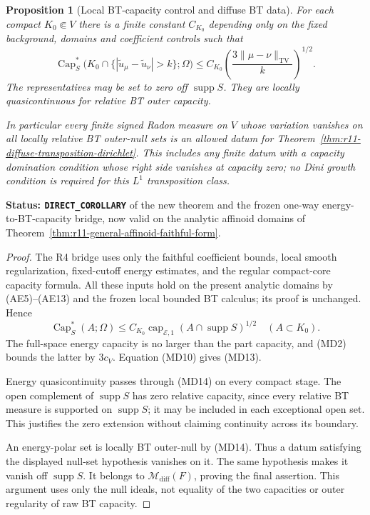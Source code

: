 \documentclass[11pt,a4paper]{article}
\numberwithin{equation}{section}
\newtheorem{proposition}[theorem]{Proposition}
\theoremstyle{definition}
\theoremstyle{remark}
\begin{document}
\begin{proposition}[Local BT-capacity control and diffuse BT data]
\label{prop:r11-bt-capacity-diffuse-dirichlet}
For each compact $K_0\Subset V$ there is a finite constant
$C_{K_0}$ depending only on the fixed background, domains and
coefficient controls such that
\[
 \operatorname{Cap}_S^*
   \bigl(K_0\cap\{|\widetilde u_\mu-\widetilde u_\nu|>k\};\Omega\bigr)
       \leq C_{K_0}
           \left(\frac{3\|\mu-\nu\|_{\mathrm{TV}}}{k}\right)^{1/2}.
 \tag{MD13}
\]
The representatives may be set to zero off $\operatorname{supp}S$.
They are locally quasicontinuous for relative BT outer capacity.

In particular every finite signed Radon measure on $V$ whose
variation vanishes on all locally relative BT outer-null sets
is an allowed datum for Theorem~\ref{thm:r11-diffuse-transposition-dirichlet}.
This includes any finite datum with a capacity domination
condition whose right side vanishes at capacity zero; no Dini
growth condition is required for this $L^1$ transposition class.
\end{proposition}

\noindent\textbf{Status: \texttt{DIRECT\_COROLLARY}} of the
new theorem and the frozen one-way energy-to-BT-capacity bridge,
now valid on the analytic affinoid domains of
Theorem~\ref{thm:r11-general-affinoid-faithful-form}.

\begin{proof}
The R4 bridge uses only the faithful coefficient bounds,
local smooth regularization, fixed-cutoff energy estimates,
and the regular compact-core capacity formula.  All these
inputs hold on the present analytic domains by (AE5)--(AE13)
and the frozen local bounded BT calculus; its proof is
unchanged.  Hence
\[
 \operatorname{Cap}_S^*(A;\Omega)
       \leq C_{K_0}\operatorname{cap}_{\mathcal E,1}
                  (A\cap\operatorname{supp}S)^{1/2}
                         \quad(A\subset K_0).
 \tag{MD14}
\]
The full-space energy capacity is no larger than the part
capacity, and (MD2) bounds the latter by $3c_V$.
Equation (MD10) gives (MD13).

Energy quasicontinuity passes through (MD14) on every compact
stage.  The open complement of $\operatorname{supp}S$ has
zero relative capacity, since every relative BT measure is
supported on $\operatorname{supp}S$; it may be included in
each exceptional open set.  This justifies the zero extension
without claiming continuity across its boundary.

An energy-polar set is locally BT outer-null by (MD14).
Thus a datum satisfying the displayed null-set hypothesis
vanishes on it.  The same hypothesis makes it vanish off
$\operatorname{supp}S$.  It belongs to
$\mathcal M_{\mathrm{diff}}(F)$, proving the final assertion.
This argument uses only the null ideals, not equality of the
two capacities or outer regularity of raw BT capacity.
\end{proof}
\end{document}

